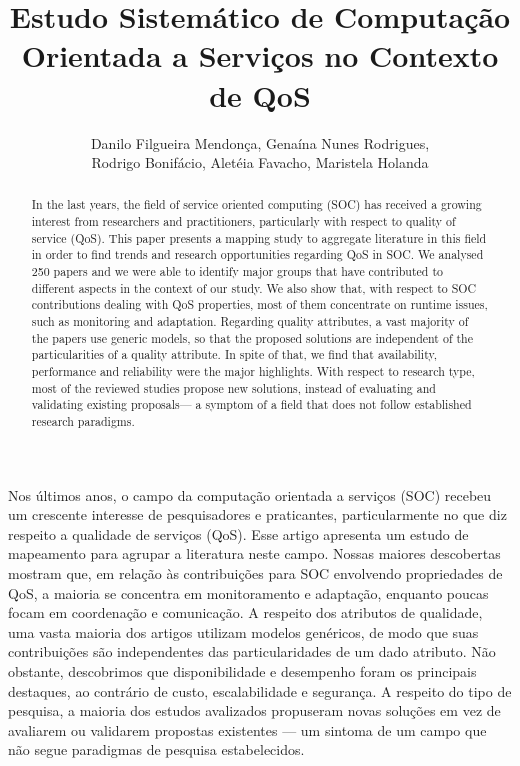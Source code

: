 \documentclass[12pt]{article}
\title{Estudo Sistem\'{a}tico de Computa\c{c}\~{a}o Orientada a Servi\c{c}os no Contexto de QoS}
\author{Danilo Filgueira Mendon\c{c}a\inst{1}, Gena\'{i}na Nunes Rodrigues\inst{1}, \\ Rodrigo Bonif\'{a}cio\inst{1}, Alet\'{e}ia Favacho\inst{1}, Maristela Holanda\inst{1} }
\begin{document}
 

\maketitle

\begin{abstract}
  In the last years, the field of service oriented computing (SOC) has received a growing interest from researchers and practitioners, particularly with respect to quality of service (QoS). This paper presents a mapping study to aggregate literature in this field in order to find trends and research opportunities regarding QoS in SOC. We analysed 250 papers and we were able to identify major groups that have contributed to different aspects in the context of our study. We also show that, with respect to SOC contributions dealing with QoS properties, most of them concentrate on runtime issues, such as monitoring and adaptation. Regarding quality attributes, a vast majority of the papers use generic models, so that the proposed solutions are independent of the particularities of a quality attribute. In spite of that, we find that availability, performance and reliability were the major highlights. With respect to research type, most of the reviewed studies propose new solutions, instead of evaluating and validating existing proposals--- a symptom of a field that does not follow established research paradigms.
\end{abstract}

\begin{resumo}
  Nos últimos anos, o campo da computação orientada a serviços (SOC) recebeu um crescente interesse de pesquisadores e praticantes, particularmente no que diz respeito a qualidade de serviços (QoS). Esse artigo apresenta um estudo de mapeamento para agrupar a literatura neste campo. Nossas maiores descobertas mostram que, em relação às contribuições para SOC envolvendo propriedades de QoS, a maioria se concentra em monitoramento e adaptação, enquanto poucas focam em coordenação e comunicação. A respeito dos atributos de qualidade, uma vasta maioria dos artigos utilizam modelos genéricos, de modo que suas contribuições são independentes das particularidades de um dado atributo. Não obstante, descobrimos que disponibilidade e desempenho foram os principais destaques, ao contrário de custo, escalabilidade e segurança. A respeito do tipo de pesquisa, a maioria dos estudos avalizados propuseram novas soluções em vez de avaliarem ou validarem propostas existentes --- um sintoma de um campo que não segue paradigmas de pesquisa estabelecidos.
\end{resumo}




    











\end{document}
